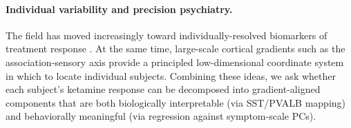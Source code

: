 \paragraph{Individual variability and precision psychiatry.} The field has
moved increasingly toward individually-resolved biomarkers of treatment
response \citep{insel2014rdoc,drysdale2017resting}. At the same time,
large-scale cortical gradients such as the association-sensory axis
\citep{margulies2016situating} provide a principled low-dimensional
coordinate system in which to locate individual subjects. Combining these
ideas, we ask whether each subject's ketamine response can be decomposed
into gradient-aligned components that are both biologically interpretable
(via SST/PVALB mapping) and behaviorally meaningful (via regression against
symptom-scale PCs).
